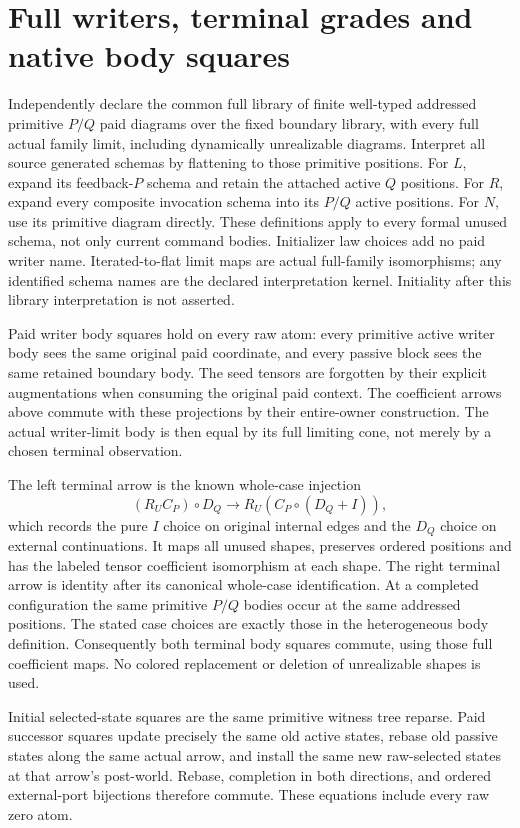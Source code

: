 \documentclass[11pt]{article}\usepackage{amsmath,amssymb,amsthm,geometry}\geometry{margin=1in}
\begin{document}
\section{Full writers, terminal grades and native body squares}
Independently declare the common full library of finite well-typed addressed primitive $P/Q$ paid diagrams over the fixed boundary library, with every full actual family limit, including dynamically unrealizable diagrams. Interpret all source generated schemas by flattening to those primitive positions. For $L$, expand its feedback-$P$ schema and retain the attached active $Q$ positions. For $R$, expand every composite invocation schema into its $P/Q$ active positions. For $N$, use its primitive diagram directly. These definitions apply to every formal unused schema, not only current command bodies. Initializer law choices add no paid writer name. Iterated-to-flat limit maps are actual full-family isomorphisms; any identified schema names are the declared interpretation kernel. Initiality after this library interpretation is not asserted.

Paid writer body squares hold on every raw atom: every primitive active writer body sees the same original paid coordinate, and every passive block sees the same retained boundary body. The seed tensors are forgotten by their explicit augmentations when consuming the original paid context. The coefficient arrows above commute with these projections by their entire-owner construction. The actual writer-limit body is then equal by its full limiting cone, not merely by a chosen terminal observation.

The left terminal arrow is the known whole-case injection
\[
 (R_UC_P)\circ D_Q\longrightarrow R_U(C_P\circ(D_Q+I)),
\]
which records the pure $I$ choice on original internal edges and the $D_Q$ choice on external continuations. It maps all unused shapes, preserves ordered positions and has the labeled tensor coefficient isomorphism at each shape. The right terminal arrow is identity after its canonical whole-case identification. At a completed configuration the same primitive $P/Q$ bodies occur at the same addressed positions. The stated case choices are exactly those in the heterogeneous body definition. Consequently both terminal body squares commute, using those full coefficient maps. No colored replacement or deletion of unrealizable shapes is used.

Initial selected-state squares are the same primitive witness tree reparse. Paid successor squares update precisely the same old active states, rebase old passive states along the same actual arrow, and install the same new raw-selected states at that arrow's post-world. Rebase, completion in both directions, and ordered external-port bijections therefore commute. These equations include every raw zero atom.
\end{document}
